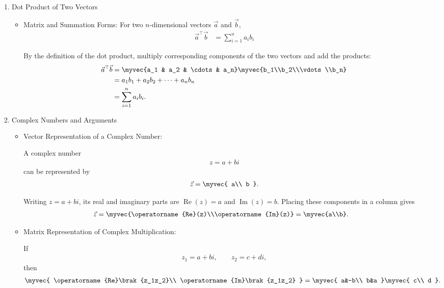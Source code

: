 \begin{enumerate}[label=\thesubsection.\arabic*, ref=\thesubsection.\theenumi,itemsep=0pt]

\item Dot Product of Two Vectors
\begin{itemize}
\item Matrix and Summation Forms:
For two $n$-dimensional vectors $\vec{a}$ and $\vec{b}$,
\begin{align}
\vec{a}^{\top}\vec{b}
&= \sum_{i=1}^{n}a_i b_i
\label{eq:dot_product}
\end{align}

\solution
By the definition of the dot product, multiply corresponding components of the two vectors and add the products:
\begin{align}
\vec{a}^{\top}\vec{b}
&=
\myvec{a_1 & a_2 & \cdots & a_n}
\myvec{b_1\\b_2\\\vdots\\b_n}
\\
&=a_1b_1+a_2b_2+\cdots+a_nb_n
\\
&=\sum_{i=1}^{n}a_i b_i.
\end{align}
\end{itemize}

\item Complex Numbers and Arguments
\begin{itemize}

\item Vector Representation of a Complex Number:

A complex number
\begin{align}
z=a+bi
\end{align}
can be represented by
\begin{align}
\vec{z}
=
\myvec{
a\\
b
}.
\label{eq:complex_vector}
\end{align}


\solution
Writing $z=a+bi$, its real and imaginary parts are $\operatorname{Re}(z)=a$ and $\operatorname{Im}(z)=b$. Placing these components in a column gives
\begin{align}
\vec{z}
&=\myvec{\operatorname{Re}(z)\\\operatorname{Im}(z)}
=\myvec{a\\b}.
\end{align}
\item Matrix Representation of Complex Multiplication:

If
\begin{align}
z_1=a+bi,
\qquad
z_2=c+di,
\end{align}
then
\begin{align}
\myvec{
\operatorname{Re}\brak{z_1z_2}\\
\operatorname{Im}\brak{z_1z_2}
}
&=
\myvec{
a&-b\\
b&a
}
\myvec{
c\\
d
}.
\label{eq:complex_multiplication_matrix}
\end{align}



\end{itemize}
\end{enumerate}

